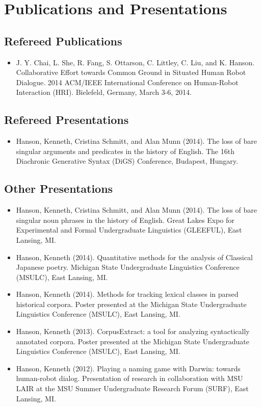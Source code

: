 \documentclass[10pt,oneside]{article}
\newcommand{\ressection}[1]{
	\vspace{-12pt}
	\section*{#1}
}
\newcommand{\ressubsection}[1]{
	\subsection*{#1}
	\vspace{-4pt}
}
\begin{document}
\ressection{Publications and Presentations}

\ressubsection{Refereed Publications}
\begin{itemize}
	\item{J. Y. Chai, L. She, R. Fang, S. Ottarson, C. Littley, C. Liu, and K. Hanson. Collaborative Effort towards Common Ground in Situated Human Robot Dialogue. 2014 ACM/IEEE International Conference on Human-Robot Interaction (HRI). Bielefeld, Germany, March 3-6, 2014.}
\end{itemize}

\ressubsection{Refereed Presentations}
\begin{itemize}
	\item{Hanson, Kenneth, Cristina Schmitt, and Alan Munn (2014). The loss of bare singular arguments and predicates in the history of English. The 16th Diachronic Generative Syntax (DiGS) Conference, Budapest, Hungary.}
\end{itemize}

\ressubsection{Other Presentations}
\begin{itemize}
	\item{Hanson, Kenneth, Cristina Schmitt, and Alan Munn (2014). The loss of bare singular noun phrases in the history of English. Great Lakes Expo for Experimental and Formal Undergraduate Linguistics (GLEEFUL), East Lansing, MI.}
	
	\item{Hanson, Kenneth (2014). Quantitative methods for the analysis of Classical Japanese poetry. Michigan State Undergraduate Linguistics Conference (MSULC), East Lansing, MI.}
	
	\item{Hanson, Kenneth (2014). Methods for tracking lexical classes in parsed historical corpora. Poster presented at the Michigan State Undergraduate Linguistics Conference (MSULC), East Lansing, MI.}
	
	\item{Hanson, Kenneth (2013). CorpusExtract: a tool for analyzing syntactically annotated corpora. Poster presented at the Michigan State Undergraduate Linguistics Conference (MSULC), East Lansing, MI.}
	
	\item{Hanson, Kenneth (2012). Playing a naming game with Darwin: towards human-robot dialog. Presentation of research in collaboration with MSU LAIR at the MSU Summer Undergraduate Research Forum (SURF), East Lansing, MI.}
\end{itemize}
\end{document}
